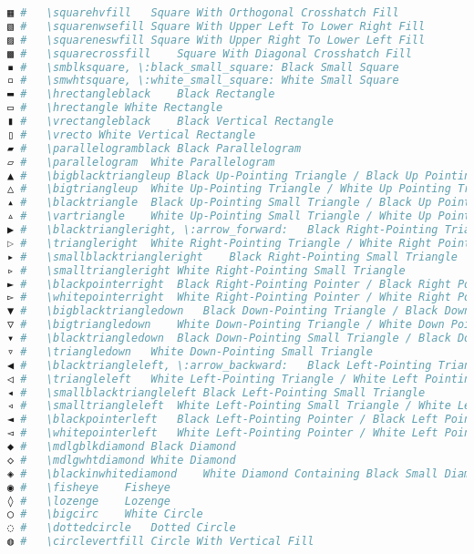 \begin{lstlisting}[language=Julia, linewidth=\textwidth]
▦ #   \squarehvfill   Square With Orthogonal Crosshatch Fill
▧ #   \squarenwsefill Square With Upper Left To Lower Right Fill
▨ #   \squareneswfill Square With Upper Right To Lower Left Fill
▩ #   \squarecrossfill    Square With Diagonal Crosshatch Fill
▪ #   \smblksquare, \:black_small_square: Black Small Square
▫ #   \smwhtsquare, \:white_small_square: White Small Square
▬ #   \hrectangleblack    Black Rectangle
▭ #   \hrectangle White Rectangle
▮ #   \vrectangleblack    Black Vertical Rectangle
▯ #   \vrecto White Vertical Rectangle
▰ #   \parallelogramblack Black Parallelogram
▱ #   \parallelogram  White Parallelogram
▲ #   \bigblacktriangleup Black Up-Pointing Triangle / Black Up Pointing Triangle
△ #   \bigtriangleup  White Up-Pointing Triangle / White Up Pointing Triangle
▴ #   \blacktriangle  Black Up-Pointing Small Triangle / Black Up Pointing Small Triangle
▵ #   \vartriangle    White Up-Pointing Small Triangle / White Up Pointing Small Triangle
▶ #   \blacktriangleright, \:arrow_forward:   Black Right-Pointing Triangle / Black Right Pointing Triangle
▷ #   \triangleright  White Right-Pointing Triangle / White Right Pointing Triangle
▸ #   \smallblacktriangleright    Black Right-Pointing Small Triangle
▹ #   \smalltriangleright White Right-Pointing Small Triangle
► #   \blackpointerright  Black Right-Pointing Pointer / Black Right Pointing Pointer
▻ #   \whitepointerright  White Right-Pointing Pointer / White Right Pointing Pointer
▼ #   \bigblacktriangledown   Black Down-Pointing Triangle / Black Down Pointing Triangle
▽ #   \bigtriangledown    White Down-Pointing Triangle / White Down Pointing Triangle
▾ #   \blacktriangledown  Black Down-Pointing Small Triangle / Black Down Pointing Small Triangle
▿ #   \triangledown   White Down-Pointing Small Triangle
◀ #   \blacktriangleleft, \:arrow_backward:   Black Left-Pointing Triangle / Black Left Pointing Triangle
◁ #   \triangleleft   White Left-Pointing Triangle / White Left Pointing Triangle
◂ #   \smallblacktriangleleft Black Left-Pointing Small Triangle
◃ #   \smalltriangleleft  White Left-Pointing Small Triangle / White Left Pointing Small Triangle
◄ #   \blackpointerleft   Black Left-Pointing Pointer / Black Left Pointing Pointer
◅ #   \whitepointerleft   White Left-Pointing Pointer / White Left Pointing Pointer
◆ #   \mdlgblkdiamond Black Diamond
◇ #   \mdlgwhtdiamond White Diamond
◈ #   \blackinwhitediamond    White Diamond Containing Black Small Diamond
◉ #   \fisheye    Fisheye
◊ #   \lozenge    Lozenge
○ #   \bigcirc    White Circle
◌ #   \dottedcircle   Dotted Circle
◍ #   \circlevertfill Circle With Vertical Fill

\end{lstlisting}
